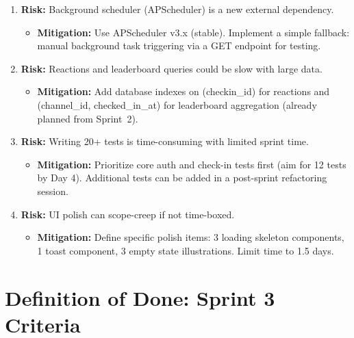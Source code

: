 \documentclass[11pt]{article}
\begin{document}
\begin{enumerate}[leftmargin=1.5em]
    \item \textbf{Risk:} Background scheduler (APScheduler) is a new external dependency.
    \begin{itemize}
        \item \textbf{Mitigation:} Use APScheduler v3.x (stable). Implement a simple fallback: manual background task triggering via a GET endpoint for testing.
    \end{itemize}

    \item \textbf{Risk:} Reactions and leaderboard queries could be slow with large data.
    \begin{itemize}
        \item \textbf{Mitigation:} Add database indexes on (checkin\_id) for reactions and (channel\_id, checked\_in\_at) for leaderboard aggregation (already planned from Sprint~2).
    \end{itemize}

    \item \textbf{Risk:} Writing 20+ tests is time-consuming with limited sprint time.
    \begin{itemize}
        \item \textbf{Mitigation:} Prioritize core auth and check-in tests first (aim for 12 tests by Day 4). Additional tests can be added in a post-sprint refactoring session.
    \end{itemize}

    \item \textbf{Risk:} UI polish can scope-creep if not time-boxed.
    \begin{itemize}
        \item \textbf{Mitigation:} Define specific polish items: 3 loading skeleton components, 1 toast component, 3 empty state illustrations. Limit time to 1.5 days.
    \end{itemize}
\end{enumerate}

\section{Definition of Done: Sprint 3 Criteria}
\end{document}
